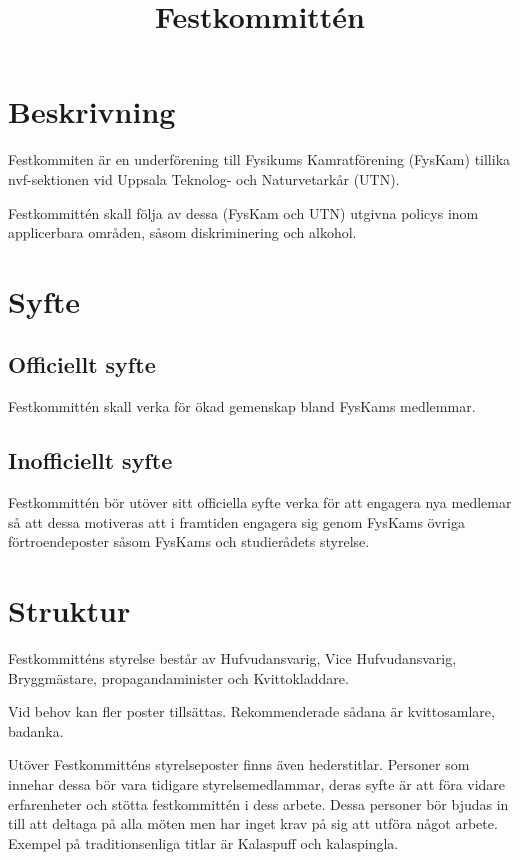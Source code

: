 \documentclass{../resources/dgovdoc}
\title{Festkommittén}
\begin{document}
\maketitle

\section{Beskrivning}

Festkommiten är en underförening till Fysikums Kamratförening (FysKam) tillika nvf-sektionen vid Uppsala Teknolog- och Naturvetarkår (UTN).

Festkommittén skall följa av dessa (FysKam och UTN) utgivna policys inom applicerbara områden, såsom diskriminering och alkohol.


\section{Syfte}

\subsection{Officiellt syfte}

Festkommittén skall verka för ökad gemenskap bland FysKams medlemmar.

\subsection{Inofficiellt syfte}

Festkommittén bör utöver sitt officiella syfte verka för att engagera nya medlemar så att dessa motiveras att i framtiden engagera sig genom FysKams övriga förtroendeposter såsom FysKams och studierådets styrelse.

\section{Struktur}

Festkommitténs styrelse består av Hufvudansvarig, Vice Hufvudansvarig, Bryggmästare, propagandaminister och Kvittokladdare.

Vid behov kan fler poster tillsättas. Rekommenderade sådana är kvittosamlare, badanka.

Utöver Festkommitténs styrelseposter finns även hederstitlar. Personer som innehar dessa bör vara tidigare styrelsemedlammar, deras syfte är att föra vidare erfarenheter och stötta festkommittén i dess arbete. Dessa personer bör bjudas in till att deltaga på alla möten men har inget krav på sig att utföra något arbete. Exempel på traditionsenliga titlar är Kalaspuff och kalaspingla.
\end{document}
